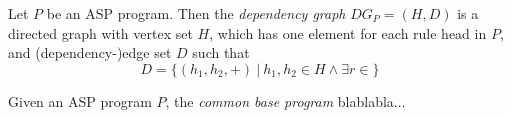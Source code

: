 \begin{definition}
Let $P$ be an ASP program. Then the \emph{dependency graph}  $\mathit{DG}_P = (H, D)$ is a directed graph with vertex set $H$, which has one element for each rule head in $P$, and (dependency-)edge set $D$ such that
\[
	D = \{ (h_1, h_2, +)\ |\ h_1, h_2 \in H \land \exists r \in \}
\]
\end{definition}

\begin{definition}
\end{definition}

\begin{definition}
Given an ASP program $P$, the \emph{common base program} blablabla...
\end{definition}

